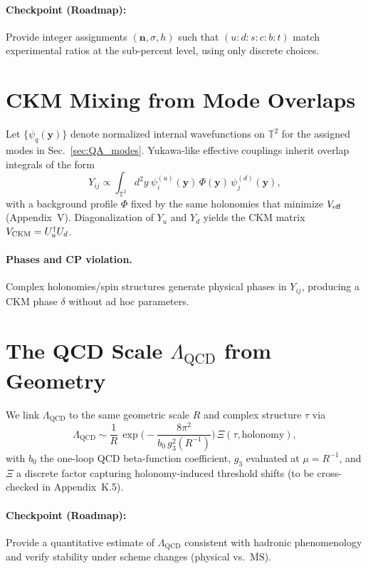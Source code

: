 \paragraph{Checkpoint (Roadmap):} Provide integer assignments $(\mathbf{n},\sigma,h)$ such that
$(u{:}d{:}s{:}c{:}b{:}t)$ match experimental ratios at the sub-percent level, using only discrete choices.

\section{CKM Mixing from Mode Overlaps}
\label{sec:QA_ckm}
Let $\{\psi_{q}(\mathbf{y})\}$ denote normalized internal wavefunctions on $\mathbb{T}^2$
for the assigned modes in Sec.~\ref{sec:QA_modes}.
Yukawa-like effective couplings inherit overlap integrals of the form
\begin{equation}
  Y_{ij} \propto \int_{\mathbb{T}^2}\! d^2y \ \psi^{(u)}_i(\mathbf{y})\,\Phi(\mathbf{y})\,\psi^{(d)}_j(\mathbf{y}),
  \label{eq:QA_overlap}
\end{equation}
with a background profile $\Phi$ fixed by the same holonomies that minimize $V_{\rm eff}$ (Appendix~V).
Diagonalization of $Y_u$ and $Y_d$ yields the CKM matrix $V_{\rm CKM}=U_u^\dagger U_d$.
\paragraph{Phases and CP violation.}
Complex holonomies/spin structures generate physical phases in $Y_{ij}$, producing a CKM phase $\delta$ without ad hoc parameters.

\section{The QCD Scale \texorpdfstring{$\Lambda_{\mathrm{QCD}}$}{Lambda\_QCD} from Geometry}
\label{sec:QA_lambda_qcd}
We link $\Lambda_{\mathrm{QCD}}$ to the same geometric scale $R$ and complex structure $\tau$ via
\begin{equation}
  \Lambda_{\mathrm{QCD}} \sim \frac{1}{R}\,\exp\!\Big(-\frac{8\pi^2}{b_0\,g_3^2(R^{-1})}\Big)\,\Xi(\tau,\text{holonomy}) ,
  \label{eq:QA_lambdaQCD}
\end{equation}
with $b_0$ the one-loop QCD beta-function coefficient, $g_3$ evaluated at $\mu\!=\!R^{-1}$,
and $\Xi$ a discrete factor capturing holonomy-induced threshold shifts (to be cross-checked in Appendix~K.5).
\paragraph{Checkpoint (Roadmap):} Provide a quantitative estimate of $\Lambda_{\mathrm{QCD}}$ consistent with hadronic phenomenology
and verify stability under scheme changes (physical vs.\ $\overline{\mathrm{MS}}$).

